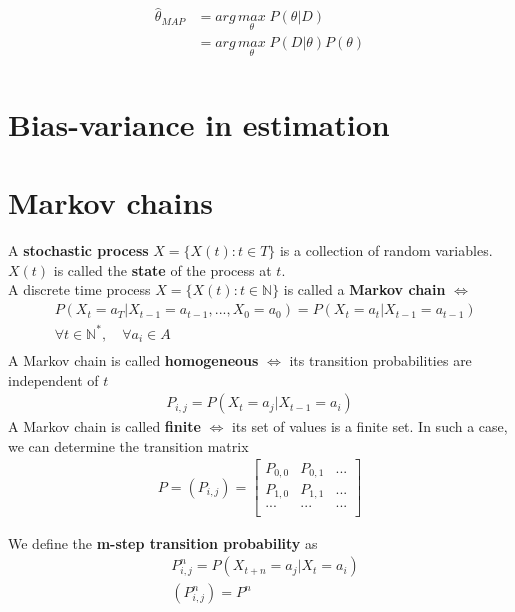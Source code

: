 \documentclass[../main.tex]{subfiles}
\begin{document}
\begin{align*}
    \hat{\theta}_{MAP} & = arg\,\underset{\theta}{max}\; P(\theta | D) \\
                       & = arg\,\underset{\theta}{max}\; P(D | \theta) P(\theta) \\
\end{align*}

\section{Bias-variance in estimation}

\section{Markov chains}

A \textbf{stochastic process} $X = \{X(t): t \in T\}$ is a collection of random variables. $X(t)$ is
called the \textbf{state} of the process at $t$. \\

A discrete time process $X = \{X(t): t \in \mathbb{N}\}$ is called a \textbf{Markov chain}
$\Leftrightarrow$
\begin{align*}
    & P(X_t=a_T | X_{t-1} = a_{t-1}, ..., X_0 = a_0) = P(X_t = a_t | X_{t-1} = a_{t-1}) \\
    & \forall t \in \mathbb{N}^*, \quad \forall a_i \in A \\
\end{align*}
A Markov chain is called \textbf{homogeneous} $\Leftrightarrow$ its transition probabilities are
independent of $t$
\begin{align*}
    P_{i,j} = P(X_t = a_j | X_{t-1} = a_i)
\end{align*}
A Markov chain is called \textbf{finite} $\Leftrightarrow$ its set of values is a finite set.
In such a case, we can determine the transition matrix
\begin{align*}
    P = (P_{i, j}) =
    \begin{bmatrix}
        P_{0,0}  & P_{0,1} & ...\\
        P_{1, 0} & P_{1,1} & ...\\
        ...      & ...     & ...\\
    \end{bmatrix}
\end{align*}

We define the \textbf{m-step transition probability} as
\begin{align*}
    &P^n_{i,j} = P(X_{t+n} = a_j | X_{t} = a_i) \\
    &(P^n_{i, j}) = P^n
\end{align*}
\end{document}
